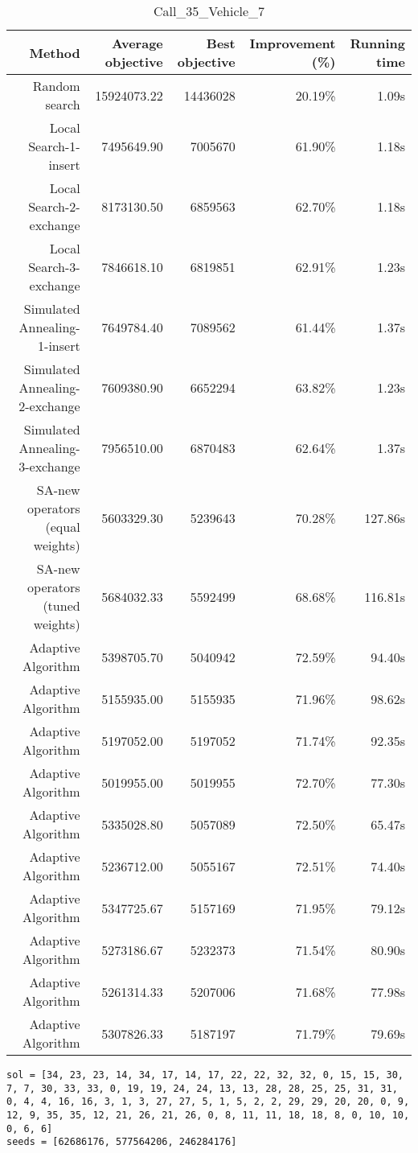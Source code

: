 \begin{table}[ht]
\centering
\caption{Call\_35\_Vehicle\_7}
\label{tab:call35vehicle7}
\begin{tabular}{|r|r|r|r|r|}
Method & Average objective & Best objective & Improvement (\%) & Running time \\
\hline
Random search & 15924073.22 & 14436028 & 20.19\% & 1.09s\\
Local Search-1-insert & 7495649.90 & 7005670 & 61.90\% & 1.18s\\
Local Search-2-exchange & 8173130.50 & 6859563 & 62.70\% & 1.18s\\
Local Search-3-exchange & 7846618.10 & 6819851 & 62.91\% & 1.23s\\
Simulated Annealing-1-insert & 7649784.40 & 7089562 & 61.44\% & 1.37s\\
Simulated Annealing-2-exchange & 7609380.90 & 6652294 & 63.82\% & 1.23s\\
Simulated Annealing-3-exchange & 7956510.00 & 6870483 & 62.64\% & 1.37s\\
SA-new operators (equal weights) & 5603329.30 & 5239643 & 70.28\% & 127.86s\\
SA-new operators (tuned weights) & 5684032.33 & 5592499 & 68.68\% & 116.81s\\
Adaptive Algorithm & 5398705.70 & 5040942 & 72.59\% & 94.40s\\
Adaptive Algorithm & 5155935.00 & 5155935 & 71.96\% & 98.62s\\
Adaptive Algorithm & 5197052.00 & 5197052 & 71.74\% & 92.35s\\
Adaptive Algorithm & 5019955.00 & 5019955 & 72.70\% & 77.30s\\
Adaptive Algorithm & 5335028.80 & 5057089 & 72.50\% & 65.47s\\
Adaptive Algorithm & 5236712.00 & 5055167 & 72.51\% & 74.40s\\
Adaptive Algorithm & 5347725.67 & 5157169 & 71.95\% & 79.12s\\
Adaptive Algorithm & 5273186.67 & 5232373 & 71.54\% & 80.90s\\
Adaptive Algorithm & 5261314.33 & 5207006 & 71.68\% & 77.98s\\
Adaptive Algorithm & 5307826.33 & 5187197 & 71.79\% & 79.69s\\
\end{tabular}%
\end{table}
\begin{lstlisting}[label={lst:call35vehicle7},caption=Optimal solution call\_35\_vehicle\_7]
sol = [34, 23, 23, 14, 34, 17, 14, 17, 22, 22, 32, 32, 0, 15, 15, 30, 7, 7, 30, 33, 33, 0, 19, 19, 24, 24, 13, 13, 28, 28, 25, 25, 31, 31, 0, 4, 4, 16, 16, 3, 1, 3, 27, 27, 5, 1, 5, 2, 2, 29, 29, 20, 20, 0, 9, 12, 9, 35, 35, 12, 21, 26, 21, 26, 0, 8, 11, 11, 18, 18, 8, 0, 10, 10, 0, 6, 6]
seeds = [62686176, 577564206, 246284176]
\end{lstlisting}%
\clearpage


